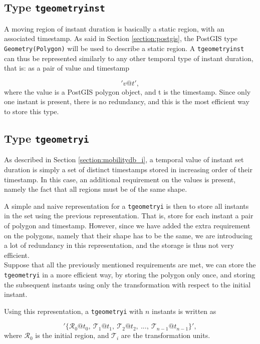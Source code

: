 \subsection{Type \texttt{tgeometryinst}}
\label{section:internal_repr_inst}

A moving region of instant duration is basically a static region, with an associated timestamp. As said in Section \ref{section:postgis}, the PostGIS type \lstinline{Geometry(Polygon)} will be used to describe a static region. A \lstinline{tgeometryinst} can thus be represented similarly to any other temporal type of instant duration, that is: as a pair of value and timestamp

\[
    'v@t', 
\]
where the value is a PostGIS polygon object, and t is the timestamp. Since only one instant is present, there is no redundancy, and this is the most efficient way to store this type.

\subsection{Type \texttt{tgeometryi}}
\label{section:internal_repr_i}

As described in Section \ref{section:mobilitydb_i}, a temporal value of instant set duration is simply a set of distinct timestamps stored in increasing order of their timestamp. In this case, an additional requirement on the values is present, namely the fact that all regions must be of the same shape.

A simple and naive representation for a \lstinline{tgeometryi} is then to store all instants in the set using the previous representation. That is, store for each instant a pair of polygon and timestamp. However, since we have added the extra requirement on the polygons, namely that their shape has to be the same, we are introducing a lot of redundancy in this representation, and the storage is thus not very efficient. \\

Suppose that all the previously mentioned requirements are met, we can store the \lstinline{tgeometryi} in a more efficient way, by storing the polygon only once, and storing the subsequent instants using only the transformation with respect to the initial instant. 

Using this representation, a \lstinline{tgeometryi} with $n$ instants is written as

\[
    '\{\mathcal{R}_0@t_0,\ \mathcal{T}_1@t_1,\ \mathcal{T}_2@t_2,\ ..., \ \mathcal{T}_{n-1}@t_{n-1}\}', 
\]
where $\mathcal{R}_0$ is the initial region, and $\mathcal{T}_i$ are the transformation units. \\

